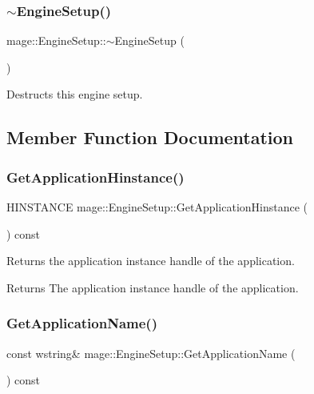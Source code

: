 \subsubsection{\texorpdfstring{$\sim$\+Engine\+Setup()}{~EngineSetup()}}
{\footnotesize\ttfamily mage\+::\+Engine\+Setup\+::$\sim$\+Engine\+Setup (\begin{DoxyParamCaption}{ }\end{DoxyParamCaption})\hspace{0.3cm}{\ttfamily [default]}}

Destructs this engine setup. 

\subsection{Member Function Documentation}
\hypertarget{structmage_1_1_engine_setup_a2d6377386d47058252d77d168d5e60ec}{}\label{structmage_1_1_engine_setup_a2d6377386d47058252d77d168d5e60ec} 
\subsubsection{\texorpdfstring{Get\+Application\+Hinstance()}{GetApplicationHinstance()}}
{\footnotesize\ttfamily H\+I\+N\+S\+T\+A\+N\+CE mage\+::\+Engine\+Setup\+::\+Get\+Application\+Hinstance (\begin{DoxyParamCaption}{ }\end{DoxyParamCaption}) const\hspace{0.3cm}{\ttfamily [noexcept]}}

Returns the application instance handle of the application.

\begin{DoxyReturn}{Returns}
The application instance handle of the application. 
\end{DoxyReturn}
\hypertarget{structmage_1_1_engine_setup_ab79015dba68069256ed42595b30a5728}{}\label{structmage_1_1_engine_setup_ab79015dba68069256ed42595b30a5728} 
\subsubsection{\texorpdfstring{Get\+Application\+Name()}{GetApplicationName()}}
{\footnotesize\ttfamily const wstring\& mage\+::\+Engine\+Setup\+::\+Get\+Application\+Name (\begin{DoxyParamCaption}{ }\end{DoxyParamCaption}) const\hspace{0.3cm}{\ttfamily [noexcept]}}

